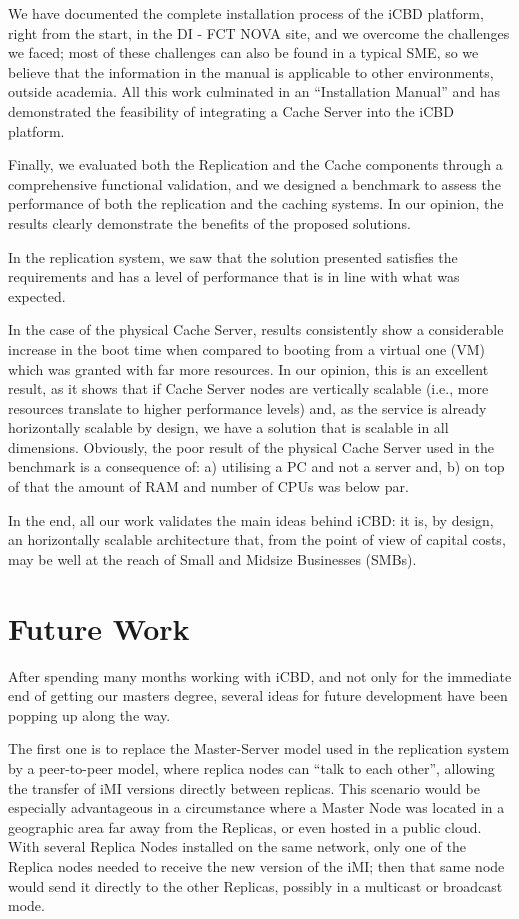 We have documented the complete installation process of the iCBD platform, right from the start, in the DI - FCT NOVA site, and we overcome the challenges we faced; most of these challenges can also be found in a typical SME, so we believe that the information in the manual is applicable to other environments, outside academia. All this work culminated in an “Installation Manual” and has demonstrated the feasibility of integrating a Cache Server into the iCBD platform.

Finally, we evaluated both the Replication and the Cache components through a comprehensive functional validation, and we designed a benchmark to assess the performance of both the replication and the caching systems. In our opinion, the results clearly demonstrate the benefits of the proposed solutions.

In the replication system, we saw that the solution presented satisfies the requirements and has a level of performance that is in line with what was expected.

In the case of the physical Cache Server, results consistently show a considerable increase in the boot time when compared to booting from a virtual one (VM) which was granted with far more resources. In our opinion, this is an excellent result, as it shows that if Cache Server nodes are vertically scalable (i.e., more resources translate to higher performance levels) and, as the service is already horizontally scalable by design, we have a solution that is scalable in all dimensions. Obviously, the poor result of the physical Cache Server used in the benchmark is a consequence of: a) utilising a PC and not a server and, b) on top of that the amount of RAM and number of CPUs was below par.

In the end, all our work validates the main ideas behind iCBD: it is, by design, an horizontally scalable architecture that, from the point of view of capital costs, may be well at the reach of Small and Midsize Businesses (SMBs). 

\section{Future Work}
\label{sec:con_future_work}

After spending many months working with iCBD, and not only for the immediate end of getting our masters degree, several ideas for future development have been popping up along the way.

The first one is to replace the Master-Server model used in the replication system by a peer-to-peer model, where replica nodes can “talk to each other”, allowing the transfer of iMI versions directly between replicas. This scenario would be especially advantageous in a circumstance where a Master Node was located in a geographic area far away from the Replicas, or even hosted in a public cloud. With several Replica Nodes installed on the same network, only one of the Replica nodes needed to receive the new version of the iMI; then that same node would send it directly to the other Replicas, possibly in a multicast or broadcast mode.

